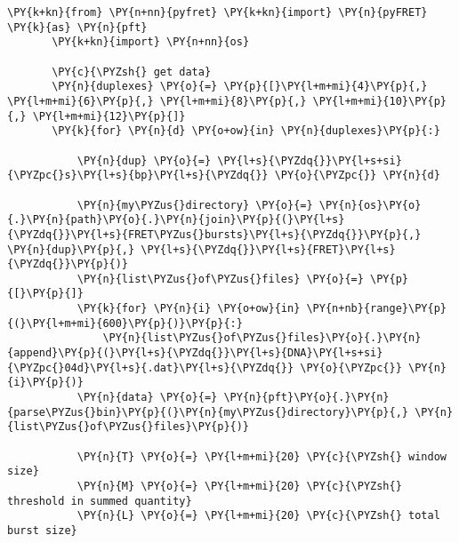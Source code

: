 \begin{Verbatim}[commandchars=\\\{\}, fontsize=\scriptsize]
       \PY{k+kn}{from} \PY{n+nn}{pyfret} \PY{k+kn}{import} \PY{n}{pyFRET} \PY{k}{as} \PY{n}{pft}
       \PY{k+kn}{import} \PY{n+nn}{os}
       
       \PY{c}{\PYZsh{} get data}
       \PY{n}{duplexes} \PY{o}{=} \PY{p}{[}\PY{l+m+mi}{4}\PY{p}{,} \PY{l+m+mi}{6}\PY{p}{,} \PY{l+m+mi}{8}\PY{p}{,} \PY{l+m+mi}{10}\PY{p}{,} \PY{l+m+mi}{12}\PY{p}{]}
       \PY{k}{for} \PY{n}{d} \PY{o+ow}{in} \PY{n}{duplexes}\PY{p}{:}
       
           \PY{n}{dup} \PY{o}{=} \PY{l+s}{\PYZdq{}}\PY{l+s+si}{\PYZpc{}s}\PY{l+s}{bp}\PY{l+s}{\PYZdq{}} \PY{o}{\PYZpc{}} \PY{n}{d}
           
           \PY{n}{my\PYZus{}directory} \PY{o}{=} \PY{n}{os}\PY{o}{.}\PY{n}{path}\PY{o}{.}\PY{n}{join}\PY{p}{(}\PY{l+s}{\PYZdq{}}\PY{l+s}{FRET\PYZus{}bursts}\PY{l+s}{\PYZdq{}}\PY{p}{,} \PY{n}{dup}\PY{p}{,} \PY{l+s}{\PYZdq{}}\PY{l+s}{FRET}\PY{l+s}{\PYZdq{}}\PY{p}{)}
           \PY{n}{list\PYZus{}of\PYZus{}files} \PY{o}{=} \PY{p}{[}\PY{p}{]}
           \PY{k}{for} \PY{n}{i} \PY{o+ow}{in} \PY{n+nb}{range}\PY{p}{(}\PY{l+m+mi}{600}\PY{p}{)}\PY{p}{:}
               \PY{n}{list\PYZus{}of\PYZus{}files}\PY{o}{.}\PY{n}{append}\PY{p}{(}\PY{l+s}{\PYZdq{}}\PY{l+s}{DNA}\PY{l+s+si}{\PYZpc{}04d}\PY{l+s}{.dat}\PY{l+s}{\PYZdq{}} \PY{o}{\PYZpc{}} \PY{n}{i}\PY{p}{)}
           \PY{n}{data} \PY{o}{=} \PY{n}{pft}\PY{o}{.}\PY{n}{parse\PYZus{}bin}\PY{p}{(}\PY{n}{my\PYZus{}directory}\PY{p}{,} \PY{n}{list\PYZus{}of\PYZus{}files}\PY{p}{)}
       
           \PY{n}{T} \PY{o}{=} \PY{l+m+mi}{20} \PY{c}{\PYZsh{} window size}
           \PY{n}{M} \PY{o}{=} \PY{l+m+mi}{20} \PY{c}{\PYZsh{} threshold in summed quantity}
           \PY{n}{L} \PY{o}{=} \PY{l+m+mi}{20} \PY{c}{\PYZsh{} total burst size}
       

\end{Verbatim}
